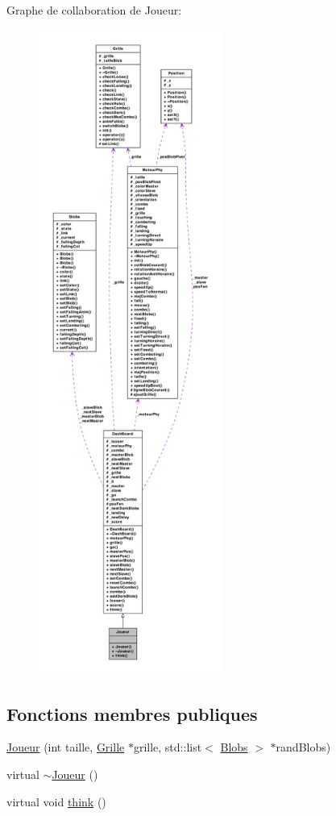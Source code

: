 Graphe de collaboration de Joueur:
\nopagebreak
\begin{figure}[H]
\begin{center}
\leavevmode
\includegraphics[height=600pt]{a00092}
\end{center}
\end{figure}
\subsection*{Fonctions membres publiques}
\begin{DoxyCompactItemize}
\item 
\hyperlink{a00012_af84fbd4551a11ca37114ff6a6b8b96db}{Joueur} (int taille, \hyperlink{a00009}{Grille} $\ast$grille, std::list$<$ \hyperlink{a00002}{Blobs} $>$ $\ast$randBlobs)
\item 
virtual \hyperlink{a00012_abc41f36d6b1f6bcecde8dbaef4186b22}{$\sim$Joueur} ()
\item 
virtual void \hyperlink{a00012_a6077e0505b66647afa4cbd6df7b3052f}{think} ()
\end{DoxyCompactItemize}


